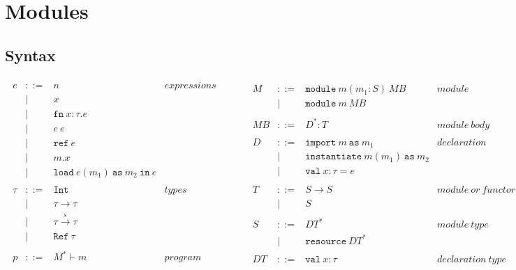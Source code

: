 \documentclass{llncs}
\newcommand{\keyw}[1]{\mathtt{#1}~}
\newcommand{\reftt}{\mathtt{ref}~}
\newcommand{\Reftt}{\mathtt{Ref}~}
\newcommand{\Inttt}{\mathtt{Int}~}
\begin{document}
\section{Modules}

\subsection{Syntax}

\[
\begin{array}{lll}
\begin{array}{lllr}
e & ::= & n & expressions \\
& | & x\\
& | & \keyw{fn} x : \tau . e \\
& | & e~e\\
& | & \reftt e \\
& | & m.x \\
& | & \keyw{load} e(m_1)~\keyw{as} m_2~\keyw{in} e \\
&&\\
\tau & ::= & \Inttt & types \\
& | & \tau \rightarrow \tau \\
& | & \tau \xrightarrow{s} \tau \\
& | & \Reftt \tau \\
&&\\
p & ::= & M^* \vdash m & program\\
\end{array}
& ~~~~~~
&
\begin{array}{lllr}
M & ::= & \keyw{module} m (m_1 : S)~MB & module \\
& | & \keyw{module} m~MB \\
&&\\
MB & ::= & D^* : T & module~body\\
&&\\
D & ::= & \keyw{import} m~\keyw{as} m_1 & declaration \\
& | & \keyw{instantiate} m(m_1)~\keyw{as} m_2 \\
& | & \keyw{val} x : \tau = e \\
&&\\
T & ::= & S \rightarrow S & module~or~functor~type\\
& | & S \\
&&\\
S & ::= & DT^* & module~type \\
& | & \keyw{resource} DT^* \\
&&\\
DT & ::= & \keyw{val} x : \tau & declaration~type
\end{array}
\end{array}
\]
\end{document}
